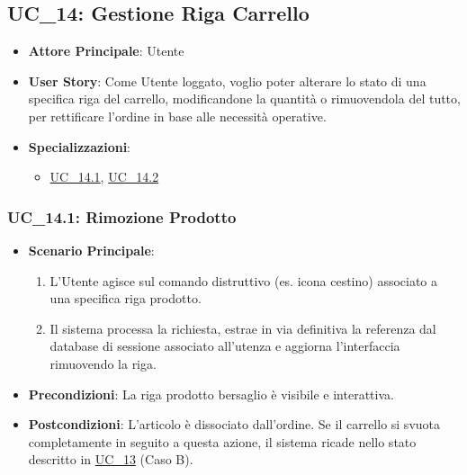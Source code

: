 
\subsection{UC\_14: Gestione Riga Carrello}
\label{uc_14}

\begin{itemize}
    \item \textbf{Attore Principale}: Utente
    \item \textbf{User Story}: Come Utente loggato, voglio poter alterare lo stato di una specifica riga del carrello, modificandone la quantità o rimuovendola del tutto, per rettificare l'ordine in base alle necessità operative.
    \item \textbf{Specializzazioni}:
    \begin{itemize}
        \item \hyperref[uc_14.1]{UC\_14.1}, \hyperref[uc_14.2]{UC\_14.2}
    \end{itemize}
\end{itemize}

\subsubsection{UC\_14.1: Rimozione Prodotto}
\label{uc_14.1}
\begin{itemize}
    \item \textbf{Scenario Principale}: 
    \begin{enumerate}
        \item L'Utente agisce sul comando distruttivo (es. icona cestino) associato a una specifica riga prodotto.
        \item Il sistema processa la richiesta, estrae in via definitiva la referenza dal database di sessione associato all'utenza e aggiorna l'interfaccia rimuovendo la riga.
    \end{enumerate}
    \item \textbf{Precondizioni}: La riga prodotto bersaglio è visibile e interattiva.
    \item \textbf{Postcondizioni}: L'articolo è dissociato dall'ordine. Se il carrello si svuota completamente in seguito a questa azione, il sistema ricade nello stato descritto in \hyperref[uc_13]{UC\_13} (Caso B).
\end{itemize}

